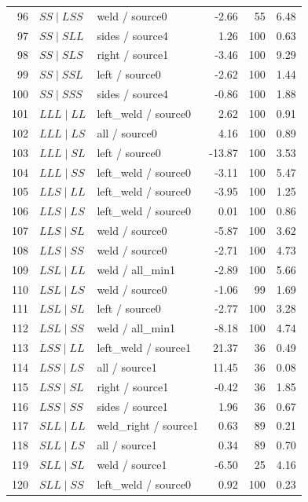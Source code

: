 \documentclass[11pt]{article}
\begin{document}
\begin{longtable}{@{}r>{\raggedright\arraybackslash}p{.28\linewidth}>{\raggedright\arraybackslash}p{.27\linewidth}rrr@{}}
96 & $SS\mid LSS$ & weld / source0 & -2.66 & 55 & 6.48\\
97 & $SS\mid SLL$ & sides / source4 & 1.26 & 100 & 0.63\\
98 & $SS\mid SLS$ & right / source1 & -3.46 & 100 & 9.29\\
99 & $SS\mid SSL$ & left / source0 & -2.62 & 100 & 1.44\\
100 & $SS\mid SSS$ & sides / source4 & -0.86 & 100 & 1.88\\
101 & $LLL\mid LL$ & left\_\allowbreak weld / source0 & 2.62 & 100 & 0.91\\
102 & $LLL\mid LS$ & all / source0 & 4.16 & 100 & 0.89\\
103 & $LLL\mid SL$ & left / source0 & -13.87 & 100 & 3.53\\
104 & $LLL\mid SS$ & left\_\allowbreak weld / source0 & -3.11 & 100 & 5.47\\
105 & $LLS\mid LL$ & left\_\allowbreak weld / source0 & -3.95 & 100 & 1.25\\
106 & $LLS\mid LS$ & left\_\allowbreak weld / source0 & 0.01 & 100 & 0.86\\
107 & $LLS\mid SL$ & weld / source0 & -5.87 & 100 & 3.62\\
108 & $LLS\mid SS$ & weld / source0 & -2.71 & 100 & 4.73\\
109 & $LSL\mid LL$ & weld / all\_\allowbreak min1 & -2.89 & 100 & 5.66\\
110 & $LSL\mid LS$ & weld / source0 & -1.06 & 99 & 1.69\\
111 & $LSL\mid SL$ & left / source0 & -2.77 & 100 & 3.28\\
112 & $LSL\mid SS$ & weld / all\_\allowbreak min1 & -8.18 & 100 & 4.74\\
113 & $LSS\mid LL$ & left\_\allowbreak weld / source1 & 21.37 & 36 & 0.49\\
114 & $LSS\mid LS$ & all / source1 & 11.45 & 36 & 0.08\\
115 & $LSS\mid SL$ & right / source1 & -0.42 & 36 & 1.85\\
116 & $LSS\mid SS$ & sides / source1 & 1.96 & 36 & 0.67\\
117 & $SLL\mid LL$ & weld\_\allowbreak right / source1 & 0.63 & 89 & 0.21\\
118 & $SLL\mid LS$ & all / source1 & 0.34 & 89 & 0.70\\
119 & $SLL\mid SL$ & weld / source1 & -6.50 & 25 & 4.16\\
120 & $SLL\mid SS$ & left\_\allowbreak weld / source0 & 0.92 & 100 & 0.23\\

\end{longtable}
\end{document}
